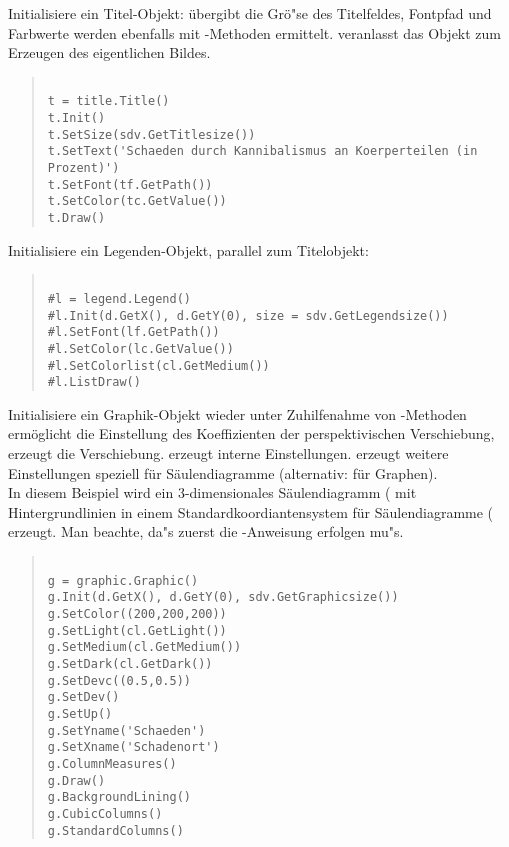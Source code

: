 Initialisiere ein Titel-Objekt:  \"ubergibt
die Gr\"o"se des Titelfeldes, Fontpfad und Farbwerte werden ebenfalls
mit -Methoden ermittelt.   veranlasst
das Objekt zum Erzeugen des eigentlichen Bildes.

\begin{small}
\begin{quote}
\begin{verbatim}

t = title.Title()
t.Init()
t.SetSize(sdv.GetTitlesize())
t.SetText('Schaeden durch Kannibalismus an Koerperteilen (in Prozent)')
t.SetFont(tf.GetPath())
t.SetColor(tc.GetValue())
t.Draw()

\end{verbatim}
\end{quote}
\end{small}

Initialisiere ein Legenden-Objekt, parallel zum Titelobjekt:

\begin{small}
\begin{quote}
\begin{verbatim}

#l = legend.Legend()
#l.Init(d.GetX(), d.GetY(0), size = sdv.GetLegendsize())
#l.SetFont(lf.GetPath())
#l.SetColor(lc.GetValue())
#l.SetColorlist(cl.GetMedium())
#l.ListDraw()

\end{verbatim}
\end{quote}
\end{small}


Initialisiere ein Graphik-Objekt wieder unter Zuhilfenahme von
-Methoden  erm\"oglicht die
Einstellung des Koeffizienten der perspektivischen Verschiebung,
 erzeugt die Verschiebung.  
erzeugt interne Einstellungen.   erzeugt
weitere Einstellungen speziell f\"ur S\"aulendiagramme (alternativ:
 f\"ur
Graphen). \\
In diesem Beispiel wird ein 3-dimensionales S\"aulendiagramm
( mit Hintergrundlinien
 in einem Standardkoordiantensystem
f\"ur S\"aulendiagramme ( erzeugt. Man
beachte, da"s zuerst die -Anweisung erfolgen mu"s.

\begin{small}
\begin{quote}
\begin{verbatim}

g = graphic.Graphic()
g.Init(d.GetX(), d.GetY(0), sdv.GetGraphicsize())
g.SetColor((200,200,200))
g.SetLight(cl.GetLight())
g.SetMedium(cl.GetMedium())
g.SetDark(cl.GetDark())
g.SetDevc((0.5,0.5))
g.SetDev()
g.SetUp()
g.SetYname('Schaeden')
g.SetXname('Schadenort')
g.ColumnMeasures()
g.Draw()
g.BackgroundLining()
g.CubicColumns()
g.StandardColumns()

\end{verbatim}
\end{quote}
\end{small}

